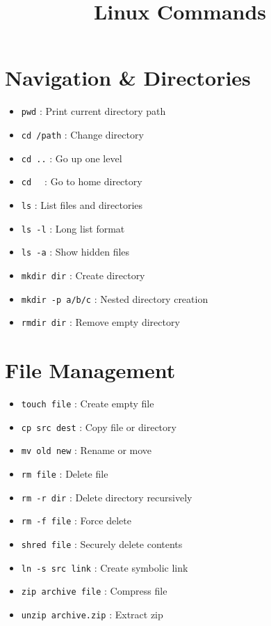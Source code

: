 \documentclass[12pt]{article}
\title{\textbf{Linux Commands}}
\author{}
\date{}
\begin{document}
\maketitle

\begin{multicols}{2}

\section*{Navigation \& Directories}
\begin{itemize}[leftmargin=0.5cm]
  \item \texttt{pwd} : Print current directory path
  \item \texttt{cd /path} : Change directory
  \item \texttt{cd ..} : Go up one level
  \item \texttt{cd ~} : Go to home directory
  \item \texttt{ls} : List files and directories
  \item \texttt{ls -l} : Long list format
  \item \texttt{ls -a} : Show hidden files
  \item \texttt{mkdir dir} : Create directory
  \item \texttt{mkdir -p a/b/c} : Nested directory creation
  \item \texttt{rmdir dir} : Remove empty directory
\end{itemize}

\section*{File Management}
\begin{itemize}[leftmargin=0.5cm]
  \item \texttt{touch file} : Create empty file
  \item \texttt{cp src dest} : Copy file or directory
  \item \texttt{mv old new} : Rename or move
  \item \texttt{rm file} : Delete file
  \item \texttt{rm -r dir} : Delete directory recursively
  \item \texttt{rm -f file} : Force delete
  \item \texttt{shred file} : Securely delete contents
  \item \texttt{ln -s src link} : Create symbolic link
  \item \texttt{zip archive file} : Compress file
  \item \texttt{unzip archive.zip} : Extract zip
\end{itemize}


\end{multicols}
\end{document}
